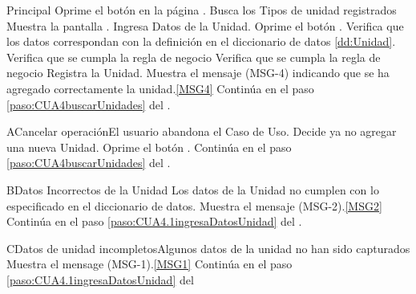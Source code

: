 	\begin{UCtrayectoria}{Principal}
		\UCpaso[\UCactor] Oprime el botón  en la página .
		\UCpaso Busca los Tipos de unidad registrados \label{paso:CUA4.1buscaTiposUnidad}
		\UCpaso Muestra la pantalla .
		\UCpaso Ingresa Datos de la Unidad. \label{paso:CUA4.1ingresaDatosUnidad}
		\UCpaso [\UCactor] Oprime el botón .
		\UCpaso Verifica que los datos correspondan con la definición en el diccionario de datos \ref{dd:Unidad}. 
		\UCpaso Verifica que se cumpla la regla de negocio 
		\UCpaso Verifica que se cumpla la regla de negocio 
 		\UCpaso Registra la Unidad.
		\UCpaso Muestra el mensaje (MSG-4) indicando que se ha agregado correctamente la unidad.\ref{MSG4}
		\UCpaso Continúa en el paso \ref{paso:CUA4buscarUnidades} del .
	\end{UCtrayectoria}
		
	\begin{UCtrayectoriaA}{A}{Cancelar operación}{El usuario abandona el Caso de Uso.}
		\UCpaso[\UCactor] Decide ya no agregar una nueva Unidad.
		\UCpaso[\UCactor] Oprime el botón .
			\UCpaso Continúa en el paso \ref{paso:CUA4buscarUnidades} del .
	\end{UCtrayectoriaA}
	\begin{UCtrayectoriaA}{B}{Datos Incorrectos de la Unidad }{Los datos de la Unidad no cumplen con lo especificado en el diccionario de datos.}
			\UCpaso Muestra el mensaje (MSG-2).\ref{MSG2} 
			\UCpaso Continúa en el paso \ref{paso:CUA4.1ingresaDatosUnidad} del .
	\end{UCtrayectoriaA}

	\begin{UCtrayectoriaA}{C}{Datos de unidad incompletos}{Algunos datos de la unidad no han sido capturados}
		\UCpaso Muestra el mensage (MSG-1).\ref{MSG1}
		\UCpaso Continúa en el paso \ref{paso:CUA4.1ingresaDatosUnidad} del 	

	\end{UCtrayectoriaA}

